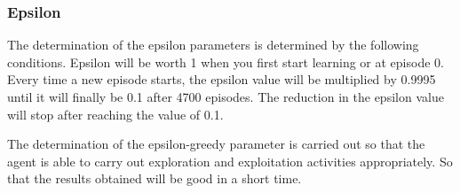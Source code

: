 \documentclass[conference]{IEEEtran}
\begin{document}

\subsubsection{Epsilon}
\label{sec:epsilon}
\begin{table}[H]
	\caption{Hyperparameter epsilon.}
	\label{tb:hyperparameter_epsilon}
\end{table}
The determination of the epsilon parameters is determined by the following conditions. Epsilon will be worth 1 when you first start learning or at episode 0. Every time a new episode starts, the epsilon value will be multiplied by 0.9995 until it will finally be 0.1 after 4700 episodes. The reduction in the epsilon value will stop after reaching the value of 0.1.

The determination of the epsilon-greedy parameter is carried out so that the agent is able to carry out exploration and exploitation activities appropriately. So that the results obtained will be good in a short time.
\end{document}

